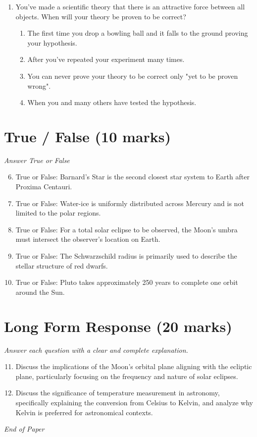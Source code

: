 \documentclass[12pt]{article}
\begin{document}
\begin{enumerate}[label=\arabic*.]
\begin{enumerate}[label=(\alph*)]
    \item Titan's atmosphere is composed mostly of hydrocarbons
    \item A and D
\end{enumerate}
\item You've made a scientific theory that there is an attractive force between all objects. When will your theory be proven to be correct?
\begin{enumerate}[label=(\alph*)]
    \item The first time you drop a bowling ball and it falls to the ground proving your hypothesis.
    \item After you've repeated your experiment many times.
    \item You can never prove your theory to be correct only "yet to be proven wrong".
    \item When you and many others have tested the hypothesis.
\end{enumerate}
\end{enumerate}

\section*{True / False (10 marks)}
\textit{Answer True or False}
\begin{enumerate}[label=\arabic*.]
\setcounter{enumi}{5}
\item True or False: Barnard's Star is the second closest star system to Earth after Proxima Centauri.
\item True or False: Water-ice is uniformly distributed across Mercury and is not limited to the polar regions.
\item True or False: For a total solar eclipse to be observed, the Moon's umbra must intersect the observer's location on Earth.
\item True or False: The Schwarzschild radius is primarily used to describe the stellar structure of red dwarfs.
\item True or False: Pluto takes approximately 250 years to complete one orbit around the Sun.
\end{enumerate}

\section*{Long Form Response (20 marks)}
\textit{Answer each question with a clear and complete explanation.}
\begin{enumerate}[label=\arabic*.]
\setcounter{enumi}{10}
\item Discuss the implications of the Moon's orbital plane aligning with the ecliptic plane, particularly focusing on the frequency and nature of solar eclipses.
\item Discuss the significance of temperature measurement in astronomy, specifically explaining the conversion from Celsius to Kelvin, and analyze why Kelvin is preferred for astronomical contexts.
\end{enumerate}

\vfill
\noindent\textit{End of Paper}
\end{document}
